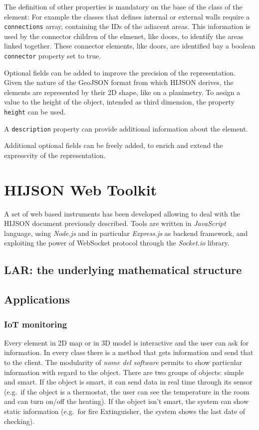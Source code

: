 \documentclass[]{article}
\begin{document}
The definition of other properties is mandatory on the base of the class
of the element: For example the classes that defines internal or
external walls require a \texttt{connections} array, containing the IDs
of the adiacent areas. This information is used by the connector
children of the elmenet, like doors, to identify the areas linked
together. These connector elements, like doors, are identified bay a
boolean \texttt{connector} property set to true.

Optional fields can be added to improve the precision of the
representation. Given the nature of the GeoJSON format from which HIJSON
derives, the elements are represented by their 2D shape, like on a
planimetry. To assign a value to the height of the object, intended as
third dimension, the property \texttt{height} can be used.

A \texttt{description} property can provide additional information about
the element.

Additional optional fields can be freely added, to enrich and extend the
expressvity of the representation.

\section{HIJSON Web Toolkit}\label{hijson-web-toolkit}

A set of web based instruments has been developed allowing to deal with
the HIJSON document previously described. Tools are written in
\emph{JavaScript} language, using \emph{Node.js} and in particular
\emph{Express.js} as backend framework, and exploiting the power of
WebSocket protocol through the \emph{Socket.io} library.

\subsection{LAR: the underlying mathematical
structure}\label{lar-the-underlying-mathematical-structure}

\subsection{Applications}\label{applications}

\subsubsection{IoT monitoring}\label{iot-monitoring}

Every element in 2D map or in 3D model is interactive and the user can
ask for information. In every class there is a method that gets
information and send that to the client. The modularity of \emph{nome
del software} permits to show particular information with regard to the
object. There are two groups of objects: simple and smart. If the object
is smart, it can send data in real time through its sensor (e.g.~if the
object is a thermostat, the user can see the temperature in the room and
can turn on/off the heating). If the object isn't smart, the system can
show static information (e.g.~for fire Extinguisher, the system shows
the last date of checking).
\end{document}
